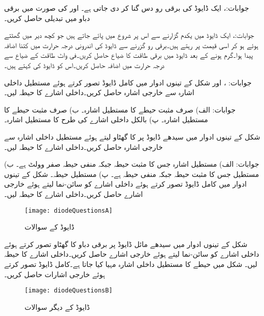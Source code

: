 جوابات:، 
ایک ڈایوڈ کی برقی رو دس گنا کر دی جاتی ہے۔ اور  کی صورت میں برقی دباو میں تبدیلی حاصل کریں۔

جوابات:، 
ایک ڈایوڈ میں یکدم  گزارنے سے اس پر شروع میں  پائے جاتے ہیں جو کچھ دیر میں گھٹتے ہوئے  ہو کر اسی قیمت پر رہتے ہیں۔برقی رو گزرنے سے ڈایوڈ کی اندرونی درجہ حرارت میں کتنا اضافہ پیدا ہوا۔گرم ہونے کے بعد ڈایوڈ میں برقی طاقت کا ضیاع حاصل کریں۔فی واٹ طاقت کے ضیاع سے درجہ حرارت میں اضافہ حاصل کریں۔اس کو ڈایوڈ کی 
 کہتے ہیں۔

جوابات: ،  اور 
شکل  کے تینوں ادوار میں کامل ڈایوڈ تصور کرتے ہوئے مستطیل داخلی اشارہ  سے  خارجی اشارہ  حاصل کریں۔داخلی اشارے کا حیطہ  لیں۔ 


جوابات: الف) صرف مثبت  حیطے کا مستطیل اشارہ۔ ب) صرف مثبت  حیطے کا مستطیل اشارہ۔ پ) بالکل داخلی اشارے کی طرح  کا مستطیل اشارہ۔

شکل  کے تینوں ادوار میں سیدھے ڈایوڈ پر  کا گھٹاو لیتے ہوئے  مستطیل داخلی اشارہ  سے  خارجی اشارہ  حاصل کریں۔داخلی اشارے کا حیطہ  لیں۔ 

جوابات: الف) مستطیل اشارہ جس کا مثبت حیطہ   جبکہ منفی حیطہ صفر وولٹ ہے۔ ب) مستطیل جس کا مثبت حیطہ  جبکہ منفی حیطہ  ہے۔ پ) مستطیل  حیطہ۔
شکل  کے تینوں ادوار میں کامل ڈایوڈ تصور کرتے ہوئے داخلی اشارے  کو سائن-نما لیتے ہوئے خارجی اشارے  حاصل کریں۔داخلی اشارے کا حیطہ  لیں۔ 

\begin{figure}
\centering
\texttt{[image: diodeQuestionsA]}
\caption{ڈایوڈ کے سوالات}
\label{شکل_ڈایوڈ_کے_سوالات_الف}
\end{figure}
شکل  کے تینوں ادوار میں  سیدھے مائل ڈایوڈ پر  برقی دباو کا گھٹاو تصور کرتے ہوئے  داخلی اشارے  کو سائن-نما لیتے ہوئے خارجی اشارے  حاصل کریں۔داخلی اشارے کا حیطہ  لیں۔ 
شکل  میں  حیطے کا مستطیل داخلی اشارہ مہیا کیا جاتا ہے۔کامل ڈایوڈ تصور کرتے ہوئے خارجی اشارات حاصل  کریں۔ 
\begin{figure}
\centering
\texttt{[image: diodeQuestionsB]}
\caption{ڈایوڈ کے دیگر سوالات}
\label{شکل_ڈایوڈ_کے_دیگر_سوالات}
\end{figure}

